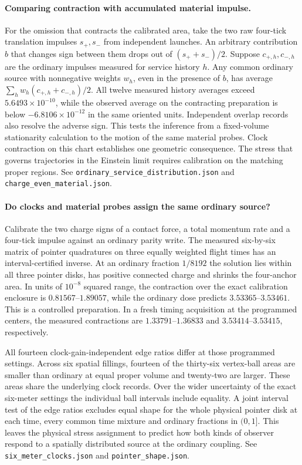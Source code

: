\documentclass[11pt]{article}
\begin{document}
\paragraph{Comparing contraction with accumulated material impulse.}
For the omission that contracts the calibrated area, take the two raw
four-tick translation impulses \(s_+,s_-\) from independent launches.
An arbitrary contribution \(b\) that changes sign between them drops
out of \((s_++s_-)/2\). Suppose \(c_{+,h},c_{-,h}\) are the ordinary
impulses measured for service history \(h\). Any common ordinary source
with nonnegative weights \(w_h\), even in the presence of \(b\), has
average \(\sum_h w_h(c_{+,h}+c_{-,h})/2\). All twelve measured
history averages exceed \(5.6493\times10^{-10}\), while the observed
average on the contracting preparation is below \(-6.8106\times10^{-12}\)
in the same oriented units. Independent overlap records also resolve
the adverse sign. This tests the inference from a fixed-volume
stationarity calculation to the motion of the same material probes.
Clock contraction on this chart establishes one geometric consequence.
The stress that governs trajectories in the Einstein limit
requires calibration on the matching proper regions. See
\texttt{ordinary\_service\_distribution.json} and
\texttt{charge\_even\_material.json}.

\paragraph{Do clocks and material probes assign the same ordinary source?}
Calibrate the two charge signs of a contact force, a total momentum
rate and a four-tick impulse against an ordinary parity write. The
measured six-by-six matrix of pointer quadratures on three equally
weighted flight times has an interval-certified inverse. At an ordinary
fraction \(1/8192\) the solution lies within all three pointer disks,
has positive connected charge and shrinks the four-anchor area. In
units of \(10^{-8}\) squared range, the contraction over the exact
calibration enclosure is \(0.81567\)--\(1.89057\), while the ordinary
dose predicts \(3.53365\)--\(3.53461\). This is a controlled
preparation. In a fresh timing acquisition at the programmed centers,
the measured contractions are \(1.33791\)--\(1.36833\) and
\(3.53414\)--\(3.53415\), respectively.

All fourteen clock-gain-independent edge ratios differ at those
programmed settings. Across six spatial fillings, fourteen of the
thirty-six vertex-ball areas are smaller than ordinary at equal proper
volume and twenty-two are larger. These areas share the underlying
clock records. Over the wider uncertainty of the exact six-meter
settings the individual ball intervals include equality. A joint
interval test of the edge ratios excludes equal shape for the whole
physical pointer disk at each time, every common time mixture and
ordinary fractions in \((0,1]\). This leaves the physical stress
assignment to predict how both kinds of observer respond to a
spatially distributed source at the ordinary coupling. See
\texttt{six\_meter\_clocks.json} and \texttt{pointer\_shape.json}.
\end{document}
